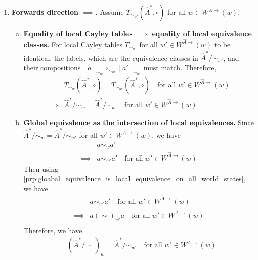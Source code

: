 \begin{proofE}
\begin{enumerate}[(1)]
    \item \textbf{Forwards direction $\implies$.}
    Assume $T_{\sim_{w'}}(\hat{A}^{*}, \circ)$ for all $w \in W^{\hat{A}\to}(w)$.
    \begin{enumerate}[(a)]
        \item \textbf{Equality of local Cayley tables $\implies$ equality of local equivalence classes.}
        For local Cayley tables $T_{\sim_{w'}}$ for all $w' \in W^{\hat{A}\to}(w)$ to be identical, the labels, which are the equivalence classes in $\hat{A}^{*}/\sim_{w'}$, and their compositions $[a]_{\sim_{w'}} \circ_{\sim_{w'}} [a']_{\sim_{w'}}$ must match.
        Therefore,
        \begin{align}
            & T_{\sim_{w}}(\hat{A}^{*}, \circ) = T_{\sim_{w'}}(\hat{A}^{*}, \circ) \quad \text{for all $w' \in W^{\hat{A}\to}(w)$} \\
            \implies & \hat{A}^{*}/\sim_{w} = \hat{A}^{*}/\sim_{w'} \quad \text{for all $w' \in W^{\hat{A}\to}(w)$}
        \end{align}

        \item \textbf{Global equivalence as the intersection of local equivalences.}
        Since $\hat{A}^{*}/\sim_{w} = \hat{A}^{*}/\sim_{w'}$ for all $w' \in W^{\hat{A}\to}(w)$, we have
        \begin{align}
            & a \sim_{w} a' \\
            \implies & a \sim_{w'} a' \quad \text{for all $w' \in W^{\hat{A}\to}(w)$}
        \end{align}
        Then using \cref{prp:gloabal_equivalence_is_local_equivalence_on_all_world_states}, we have
        \begin{align}
            & a \sim_{w'} a' \quad \text{for all $w' \in W^{\hat{A}\to}(w)$} \\
            \implies & a (\sim)_{w'} a \quad \text{for all $w' \in W^{\hat{A}\to}(w)$} \\
        \end{align}
        Therefore, we have
        \begin{align}
            & (\hat{A}^{*}/\sim)_{w} = \hat{A}^{*}/\sim_{w'} \quad \text{for all $w' \in W^{\hat{A}\to}(w)$} \\
        \end{align}
    \end{enumerate}


\end{enumerate}
\end{proofE}
